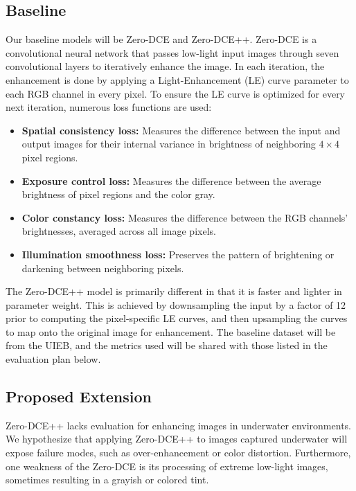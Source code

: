 \documentclass[11pt, letterpaper]{article}
\begin{document}
\subsection{Baseline}

Our baseline models will be Zero-DCE and Zero-DCE++. Zero-DCE is a convolutional neural network that passes low-light input images through seven convolutional layers to iteratively enhance the image. In each iteration, the enhancement is done by applying a Light-Enhancement (LE) curve parameter to each RGB channel in every pixel. To ensure the LE curve is optimized for every next iteration, numerous loss functions are used:

\begin{itemize}[noitemsep]
  \item \textbf{Spatial consistency loss:} Measures the difference between the input and output images for their internal variance in brightness of neighboring $4 \times 4$ pixel regions.
  \item \textbf{Exposure control loss:} Measures the difference between the average brightness of pixel regions and the color gray.
  \item \textbf{Color constancy loss:} Measures the difference between the RGB channels' brightnesses, averaged across all image pixels.
  \item \textbf{Illumination smoothness loss:} Preserves the pattern of brightening or darkening between neighboring pixels.
\end{itemize}

The Zero-DCE++ model is primarily different in that it is faster and lighter in parameter weight. This is achieved by downsampling the input by a factor of 12 prior to computing the pixel-specific LE curves, and then upsampling the curves to map onto the original image for enhancement. The baseline dataset will be from the UIEB, and the metrics used will be shared with those listed in the evaluation plan below.

\subsection{Proposed Extension}

Zero-DCE++ lacks evaluation for enhancing images in underwater environments. We hypothesize that applying Zero-DCE++ to images captured underwater will expose failure modes, such as over-enhancement or color distortion. Furthermore, one weakness of the Zero-DCE is its processing of extreme low-light images, sometimes resulting in a grayish or colored tint.
\end{document}
